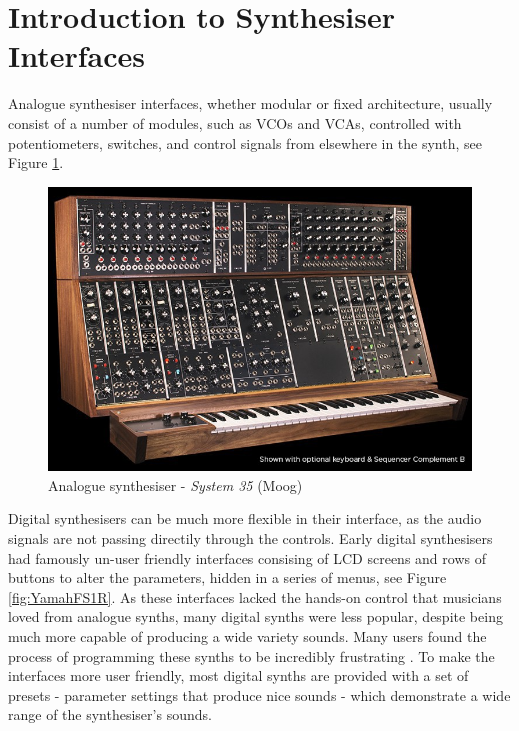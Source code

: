 \documentclass[11pt, oneside]{report}   	%
\begin{document}
\section{Introduction to Synthesiser Interfaces}
Analogue synthesiser interfaces, whether modular or fixed architecture, usually consist of a number of modules, such as VCOs and VCAs, controlled with potentiometers, switches, and control signals from elsewhere in the synth, see Figure \ref{fig:MoogSystem35}. \\
%
\begin{figure}[h]
	\centering
	\includegraphics[width = 5in]{MoogSystem35.jpg}
	\caption{Analogue synthesiser - \emph{System 35} (Moog)}
	\label{fig:MoogSystem35}
\end{figure}
%
Digital synthesisers can be much more flexible in their interface, as the audio signals are not passing directily through the controls. Early digital synthesisers had famously un-user friendly interfaces consising of LCD screens and rows of buttons to alter the parameters, hidden in a series of menus, see Figure \ref{fig:YamahFS1R}. As these interfaces lacked the hands-on control that musicians loved from analogue synths, many digital synths were less popular, despite being much more capable of producing a wide variety sounds. Many users found the process of programming these synths to be incredibly frustrating \cite{Synth}. To make the interfaces more user friendly, most digital synths are provided with a set of presets - parameter settings that produce nice sounds - which demonstrate a wide range of the synthesiser's sounds. %
\end{document}
